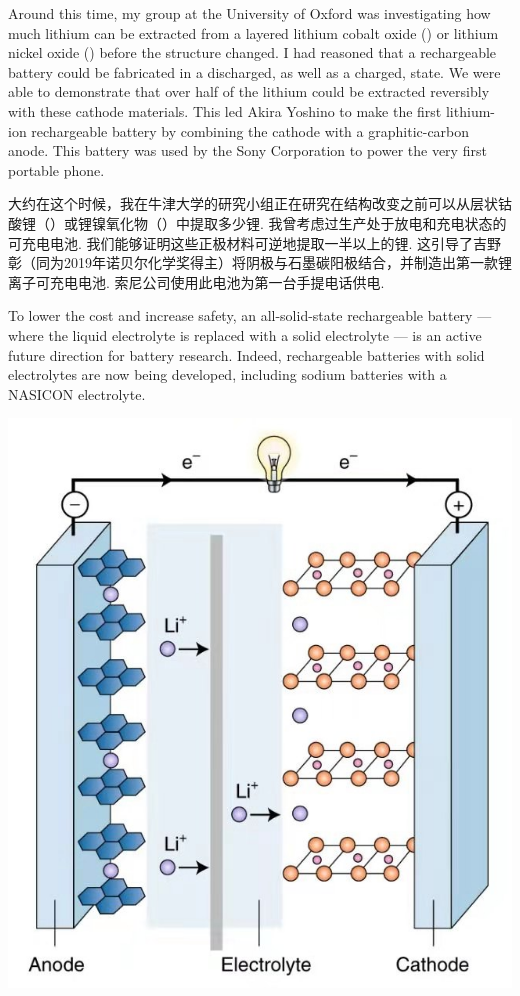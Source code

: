 \begin{multicols}{2}
Around this time, my group at the University of Oxford was investigating how much lithium can be extracted from a layered lithium cobalt oxide () or lithium nickel oxide () before the structure changed. I had reasoned that a rechargeable battery could be fabricated in a discharged, as well as a charged, state. We were able to demonstrate that over half of the lithium could be extracted reversibly with these cathode materials. This led Akira Yoshino to make the first lithium-ion rechargeable battery by combining the  cathode with a graphitic-carbon anode. This battery was used by the Sony Corporation to power the very first portable phone. 

大约在这个时候，我在牛津大学的研究小组正在研究在结构改变之前可以从层状钴酸锂（）或锂镍氧化物（）中提取多少锂. 我曾考虑过生产处于放电和充电状态的可充电电池. 我们能够证明这些正极材料可逆地提取一半以上的锂. 这引导了吉野彰（同为2019年诺贝尔化学奖得主）将阴极与石墨碳阳极结合，并制造出第一款锂离子可充电电池. 索尼公司使用此电池为第一台手提电话供电. 

To lower the cost and increase safety, an all-solid-state rechargeable battery — where the liquid electrolyte is replaced with a solid electrolyte — is an active future direction for battery research. Indeed, rechargeable batteries with solid electrolytes are now being developed, including sodium batteries with a NASICON electrolyte. 

\includegraphics[width=0.8\linewidth]{IMG/201910/191004.jpeg}


\end{multicols}
